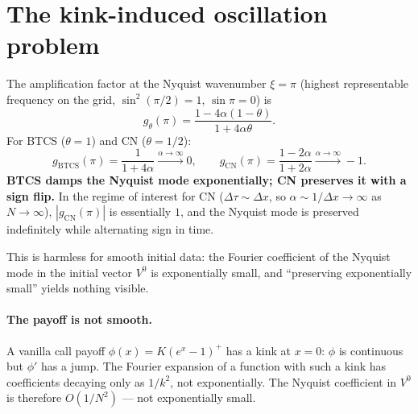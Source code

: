 \documentclass[11pt,a4paper]{article}
\begin{document}
\section{The kink-induced oscillation problem}
\label{sec:kink}

The amplification factor at the Nyquist wavenumber $\xi = \pi$
(highest representable frequency on the grid, $\sin^2(\pi/2) = 1$,
$\sin\pi = 0$) is
\[
g_\theta(\pi) = \frac{1 - 4\alpha(1-\theta)}{1 + 4\alpha\theta}.
\]
For BTCS ($\theta = 1$) and CN ($\theta = 1/2$):
\[
g_{\mathrm{BTCS}}(\pi) = \frac{1}{1 + 4\alpha}
\xrightarrow{\alpha \to \infty} 0,
\qquad
g_{\mathrm{CN}}(\pi) = \frac{1 - 2\alpha}{1 + 2\alpha}
\xrightarrow{\alpha \to \infty} -1.
\]
\textbf{BTCS damps the Nyquist mode exponentially; CN preserves it
with a sign flip.} In the regime of interest for CN ($\Delta\tau \sim
\Delta x$, so $\alpha \sim 1/\Delta x \to \infty$ as $N \to \infty$),
$|g_{\mathrm{CN}}(\pi)|$ is essentially $1$, and the Nyquist mode is
preserved indefinitely while alternating sign in time.

This is harmless for smooth initial data: the Fourier coefficient of
the Nyquist mode in the initial vector $V^0$ is exponentially small,
and ``preserving exponentially small'' yields nothing visible.

\paragraph{The payoff is not smooth.} A vanilla call payoff
$\phi(x) = K(e^x - 1)^+$ has a kink at $x = 0$: $\phi$ is continuous
but $\phi'$ has a jump. The Fourier expansion of a function with such
a kink has coefficients decaying only as $1/k^2$, not exponentially.
The Nyquist coefficient in $V^0$ is therefore $O(1/N^2)$ --- not
exponentially small.
\end{document}
